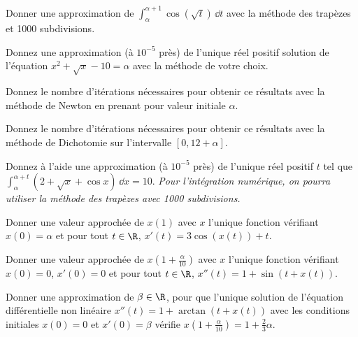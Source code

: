 \question{} Donner une approximation de $\int_{\alpha}^{\alpha+1} \cos(\sqrt{t})\, \dd t$ avec la méthode des trapèzes et 1000 subdivisions.


\question{}  Donnez une approximation (à $10^{-5}$ près) de l'unique réel positif solution de
  l'équation $x^{2}+\sqrt{x}-10 = \alpha$ avec la méthode de votre choix.
  
  \question{}
  Donnez le nombre d'itérations nécessaires pour obtenir ce résultats avec la méthode de Newton en prenant pour valeur initiale $\alpha$.
  
\question{}
  Donnez le nombre d'itérations nécessaires pour obtenir ce résultats avec la méthode de Dichotomie sur l'intervalle $\left[0,12+\alpha\right]$.



\question{}
  Donnez à l'aide une approximation (à $10^{-5}$ près) de l'unique réel positif $t$ tel que $    \int_{\alpha}^{\alpha+t} (2+\sqrt{x}+\cos x)\, \dd x = 10$.
  \textit{Pour l'intégration numérique, on pourra utiliser la méthode des trapèzes avec 1000 subdivisions.}
  


\question{}
  Donner une valeur approchée de $x(1)$ avec $x$ l'unique fonction
  vérifiant $x(0)=\alpha$ et pour tout $t\in \R$, $x'(t) = 3\cos(x(t))
  + t$.


\question{}
  Donner une valeur approchée de $x\left(1+\frac{\alpha}{10}\right)$ avec $x$ l'unique fonction
  vérifiant $x(0)=0$, $x'(0)=0$ et pour tout $t\in \R$, $x''(t) = 1 + \sin(t+x(t))$.

\question{}
  Donner une approximation de $\beta\in \R$, pour que l'unique
  solution de l'équation différentielle non linéaire $x''(t)=
  1+\arctan(t+x(t))$ avec les conditions initiales $x(0)=0$ et
  $x'(0)=\beta$ vérifie    $x\left(1+\frac{\alpha}{10}\right) = 1 + \frac{2}{3}\alpha$.

